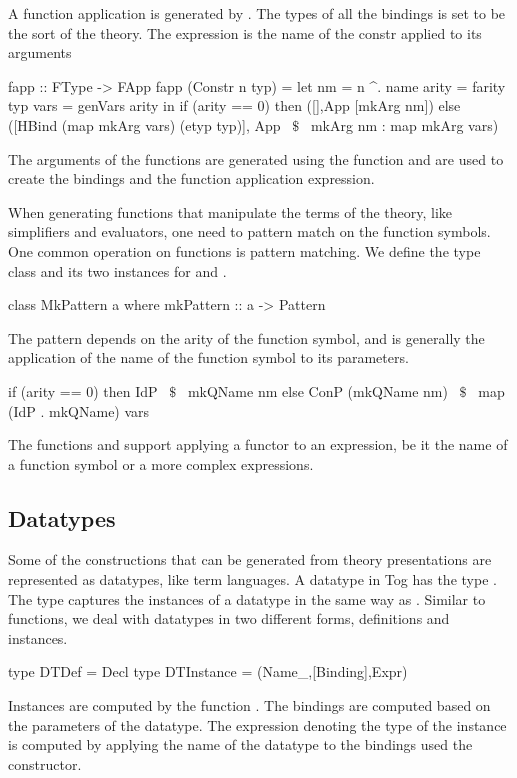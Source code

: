A function application is generated by . The types of all the bindings is set to be the sort of the theory. The expression is the name of the constr applied to its arguments 
\begin{hscode} 
fapp :: FType -> FApp
fapp (Constr n typ) =
 let nm = n ^. name
     arity = farity typ
     vars = genVars arity
 in if (arity == 0) then ([],App [mkArg nm])
    else ([HBind (map mkArg vars) (etyp typ)],
          App ~$\$$~ mkArg nm : map mkArg vars) 
\end{hscode} 
\noindent The arguments of the functions are generated using the  function and are used to create the bindings and the function application expression. %

When generating functions that manipulate the terms of the theory, like simplifiers and evaluators, one need to pattern match on the function symbols. One common operation on functions is pattern matching. We define the type class  and its two instances for  and . 
\begin{hscode}
class MkPattern a where
  mkPattern :: a -> Pattern
\end{hscode} 
The pattern depends on the arity of the function symbol, and is generally the application of the name of the function symbol to its parameters. 
\begin{hscode} 
 if (arity == 0)
 then IdP ~$\$$~ mkQName nm 
 else ConP (mkQName nm) ~$\$$~ map (IdP . mkQName) vars 
\end{hscode} 

The functions  and  support applying a functor to an expression, be it the name of a function symbol or a more complex expressions.

\subsection{Datatypes}
\label{subsec:generation:datatypes}
Some of the constructions that can be generated from theory presentations are represented as datatypes, like term languages. A datatype in Tog has the type . The type  captures the instances of a datatype in the same way as .
Similar to functions, we deal with datatypes in two different forms, definitions and instances. 
\begin{hscode}
type DTDef = Decl
type DTInstance = (Name_,[Binding],Expr) 
\end{hscode}
\noindent Instances are computed by the function . The bindings are computed based on the parameters of the datatype. The expression denoting the type of the instance is computed by applying the name of the datatype to the bindings used the  constructor. 

